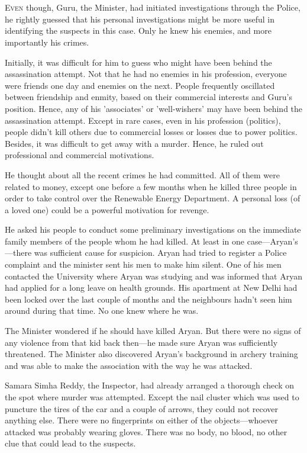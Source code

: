 \chapter{}

\lettrine{E}{ven} though, Guru, the Minister, had initiated investigations through the
Police, he rightly guessed that his personal investigations might be more useful
in identifying the suspects in this case. Only he knew his enemies, and more
importantly his crimes.

Initially, it was difficult for him to guess who might have been behind the
assassination attempt. Not that he had no enemies in his profession, everyone
were friends one day and enemies on the next. People frequently oscillated
between friendship and enmity, based on their commercial interests and Guru's
position. Hence, any of his 'associates' or 'well-wishers' may have been behind
the assassination attempt. Except in rare cases, even in his profession
(politics), people didn't kill others due to commercial losses or losses due to
power politics. Besides, it was difficult to get away with a murder. Hence, he
ruled out professional and commercial motivations.

He thought about all the recent crimes he had committed. All of them were
related to money, except one before a few months when he killed three people in
order to take control over the Renewable Energy Department. A personal loss (of
a loved one) could be a powerful motivation for revenge.

He asked his people to conduct some preliminary investigations on the immediate
family members of the people whom he had killed. At least in one
case—Aryan's—there was sufficient cause for suspicion. Aryan had tried to register
a Police
complaint and the minister sent his men to make him silent. One of his men
contacted the University where Aryan was studying and was informed that Aryan
had applied for a long leave on health grounds. His apartment at New Delhi had
been locked over the last couple of months and the neighbours hadn't seen him
around during that time. No one knew where he was.

The Minister wondered if he should have killed Aryan. But there were no signs of
any violence from that kid back then—he made sure Aryan was sufficiently
threatened. The Minister also discovered Aryan's background in archery training
and was able to make the association with the way he was attacked.

Samara Simha Reddy, the Inspector, had already arranged a thorough check on the
spot where murder was attempted. Except the nail cluster which was used to
puncture the tires of the car and a couple of arrows, they could not recover
anything else. There were no fingerprints on either of the objects—whoever
attacked was probably wearing gloves. There was no body, no blood, no other clue
that could lead to the suspects.

